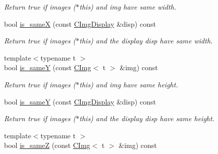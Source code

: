 \begin{DoxyCompactItemize}
\begin{DoxyCompactList}\small\item\em Return {\ttfamily true} if images {\ttfamily }($\ast$this) and {\ttfamily img} have same width. \end{DoxyCompactList}\item 
\hypertarget{structcimg__library_1_1_c_img_af47030feb9d6fb87462ed939b7e45ea5}{bool \hyperlink{structcimg__library_1_1_c_img_af47030feb9d6fb87462ed939b7e45ea5}{is\-\_\-same\-X} (const \hyperlink{structcimg__library_1_1_c_img_display}{C\-Img\-Display} \&disp) const }\label{structcimg__library_1_1_c_img_af47030feb9d6fb87462ed939b7e45ea5}

\begin{DoxyCompactList}\small\item\em Return {\ttfamily true} if images {\ttfamily }($\ast$this) and the display {\ttfamily disp} have same width. \end{DoxyCompactList}\item 
\hypertarget{structcimg__library_1_1_c_img_a2eeb3e54fb0452cb88439d050af3ed32}{{\footnotesize template$<$typename t $>$ }\\bool \hyperlink{structcimg__library_1_1_c_img_a2eeb3e54fb0452cb88439d050af3ed32}{is\-\_\-same\-Y} (const \hyperlink{structcimg__library_1_1_c_img}{C\-Img}$<$ t $>$ \&img) const }\label{structcimg__library_1_1_c_img_a2eeb3e54fb0452cb88439d050af3ed32}

\begin{DoxyCompactList}\small\item\em Return {\ttfamily true} if images {\ttfamily }($\ast$this) and {\ttfamily img} have same height. \end{DoxyCompactList}\item 
\hypertarget{structcimg__library_1_1_c_img_aa686f35fb0e2a1d03ee7dc55fa97601d}{bool \hyperlink{structcimg__library_1_1_c_img_aa686f35fb0e2a1d03ee7dc55fa97601d}{is\-\_\-same\-Y} (const \hyperlink{structcimg__library_1_1_c_img_display}{C\-Img\-Display} \&disp) const }\label{structcimg__library_1_1_c_img_aa686f35fb0e2a1d03ee7dc55fa97601d}

\begin{DoxyCompactList}\small\item\em Return {\ttfamily true} if images {\ttfamily }($\ast$this) and the display {\ttfamily disp} have same height. \end{DoxyCompactList}\item 
\hypertarget{structcimg__library_1_1_c_img_ae428a7a3387ab4556e7d1ad1944ac053}{{\footnotesize template$<$typename t $>$ }\\bool \hyperlink{structcimg__library_1_1_c_img_ae428a7a3387ab4556e7d1ad1944ac053}{is\-\_\-same\-Z} (const \hyperlink{structcimg__library_1_1_c_img}{C\-Img}$<$ t $>$ \&img) const }\label{structcimg__library_1_1_c_img_ae428a7a3387ab4556e7d1ad1944ac053}


\end{DoxyCompactItemize}
